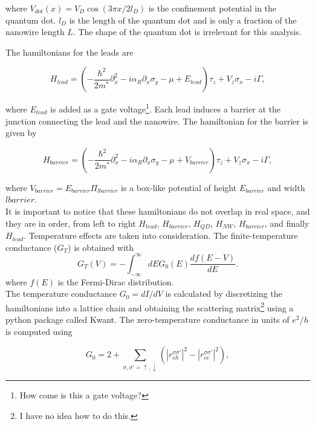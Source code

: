 where $V_{dot}(x) = V_D\cos(3\pi x/ 2l_D)$ is the confinement potential in the quantum dot. $l_D$ is the length of the quantum dot and is only a fraction of the nanowire length $L$. The shape of the quantum dot is irrelevant for this analysis. 

The hamiltonians for the leads are

\begin{equation}
    H_{lead} = \left(-\frac{\hbar^2}{2m^*}\partial^2_x - i\alpha_R\partial_x\sigma_y -\mu + E_{lead}\right)\tau_z + V_z\sigma_x - i\Gamma,
\end{equation}

where $E_{lead}$ is added as a gate voltage\footnote{How come is this a gate voltage?}. Each lead induces a barrier at the junction connecting the lead and the nanowire. The hamiltonian for the barrier is given by

\begin{equation}
    H_{barrier} = \left(-\frac{\hbar^2}{2m^*}\partial^2_x - i\alpha_R\partial_x\sigma_y -\mu + V_{barrier}\right)\tau_z + V_z\sigma_x - i\Gamma,
\end{equation}

where $V_{barrier} = E_{barrier}\Pi_{lbarrier}$ is a box-like potential of height $E_{barrier}$ and width $lbarrier$.\\

It is important to notice that these hamiltonians do not overlap in real space, and they are in order, from left to right $H_{lead}$, $H_{barrier}$, $H_{QD}$, $H_{NW}$, $H_{barrier}$, and finally $H_{lead}$. Temperature effects are taken into consideration. The finite-temperature conductance ($G_T$) is obtained with 
\begin{equation}
    G_T(V) = -\int^\infty_{-\infty} dEG_0(E) \frac{df(E-V)}{dE}.
\end{equation}
where $f(E)$ is the Fermi-Dirac distribution.\\

The temperature conductance $G_0=dI/dV$ is calculated by discretizing the hamiltonians into a lattice chain and obtaining the scattering matrix\footnote{I have no idea how to do this.} using a python package called Kwant. The zero-temperature conductance in units of $e^2/h$ is computed using

\begin{equation}
    G_0 = 2 + \sum_{\sigma,\sigma' = \uparrow, \downarrow} \left(|r_{eh}^{\sigma \sigma'}|^2 - |r_{ee}^{\sigma \sigma'}|^2\right),
\end{equation}

